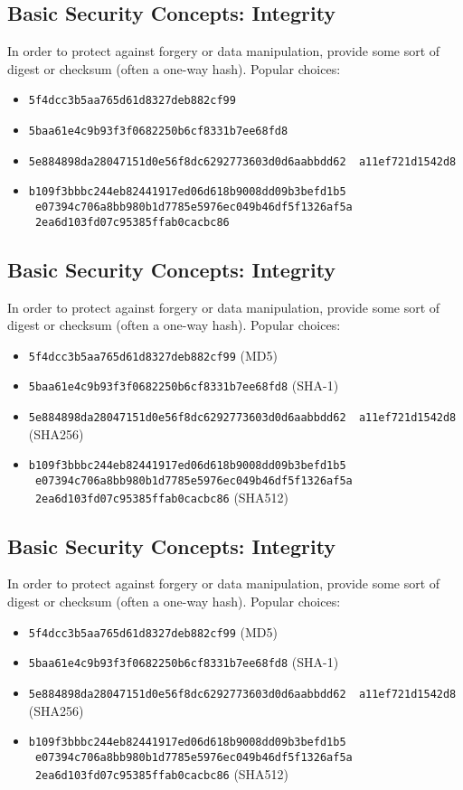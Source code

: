 \documentclass[xga]{xdvislides}
\begin{document}
\subsection{Basic Security Concepts: Integrity}
In order to protect against forgery or data manipulation, provide some sort of
digest or checksum (often a one-way hash).  Popular choices:

\begin{itemize}
	\item {\tt 5f4dcc3b5aa765d61d8327deb882cf99}
	\item {\tt 5baa61e4c9b93f3f0682250b6cf8331b7ee68fd8}
	\item {\tt 5e884898da28047151d0e56f8dc6292773603d0d6aabbdd62 \
                   a11ef721d1542d8}
	\item {\tt b109f3bbbc244eb82441917ed06d618b9008dd09b3befd1b5 \
                   e07394c706a8bb980b1d7785e5976ec049b46df5f1326af5a \
                   2ea6d103fd07c95385ffab0cacbc86}
\end{itemize}

\subsection{Basic Security Concepts: Integrity}
In order to protect against forgery or data manipulation, provide some sort of
digest or checksum (often a one-way hash).  Popular choices:

\begin{itemize}
	\item {\tt 5f4dcc3b5aa765d61d8327deb882cf99} (MD5)
	\item {\tt 5baa61e4c9b93f3f0682250b6cf8331b7ee68fd8} (SHA-1)
	\item {\tt 5e884898da28047151d0e56f8dc6292773603d0d6aabbdd62 \
                   a11ef721d1542d8} (SHA256)
	\item {\tt b109f3bbbc244eb82441917ed06d618b9008dd09b3befd1b5 \
                   e07394c706a8bb980b1d7785e5976ec049b46df5f1326af5a \
                   2ea6d103fd07c95385ffab0cacbc86} (SHA512)
\end{itemize}

\subsection{Basic Security Concepts: Integrity}
In order to protect against forgery or data manipulation, provide some sort of
digest or checksum (often a one-way hash).  Popular choices:

\begin{itemize}
	\item {\tt 5f4dcc3b5aa765d61d8327deb882cf99} (MD5)
	\item {\tt 5baa61e4c9b93f3f0682250b6cf8331b7ee68fd8} (SHA-1)
	\item {\tt 5e884898da28047151d0e56f8dc6292773603d0d6aabbdd62 \
                   a11ef721d1542d8} (SHA256)
	\item {\tt b109f3bbbc244eb82441917ed06d618b9008dd09b3befd1b5 \
                   e07394c706a8bb980b1d7785e5976ec049b46df5f1326af5a \
                   2ea6d103fd07c95385ffab0cacbc86} (SHA512)
\end{itemize}
\end{document}
